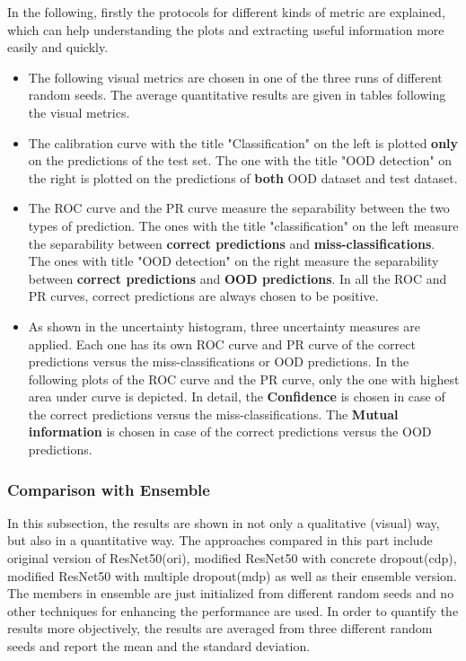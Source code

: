 In the following, firstly the protocols for different kinds of metric are explained, which can help understanding the plots and extracting useful information more easily and quickly.  
\begin{itemize}
	\item The following visual metrics are chosen in one of the three runs of different random seeds. The average quantitative results are given in tables following the visual metrics.
	\item The calibration curve with the title "Classification" on the left is plotted \textbf{only} on the predictions of the test set. The one with the title "OOD detection" on the right is plotted on the predictions of \textbf{both} OOD dataset and test dataset.
	\item The ROC curve and the PR curve measure the separability between the two types of prediction.
	The ones with the title "classification" on the left measure the separability between \textbf{correct predictions} and \textbf{miss-classifications}. The ones with title "OOD detection" on the right measure the separability between \textbf{correct predictions} and \textbf{OOD predictions}. In all the ROC and PR curves, correct predictions are always chosen to be positive.
	\item As shown in the uncertainty histogram, three uncertainty measures are applied. Each one has its own ROC curve and PR curve of the correct predictions versus the miss-classifications or OOD predictions. In the following plots of the ROC curve and the PR curve, only the one with highest area under curve is depicted. In detail, the \textbf{Confidence} is chosen in case of the correct predictions versus the miss-classifications. The \textbf{Mutual information} is chosen in case of the correct predictions versus the OOD predictions.
\end{itemize}   

\subsubsection{Comparison with Ensemble}
In this subsection, the results are shown in not only a qualitative (visual) way, but also in a quantitative way. The approaches compared in this part include original version of ResNet50(ori), modified ResNet50 with concrete dropout(cdp), modified ResNet50 with multiple dropout(mdp) as well as their ensemble version. The members in ensemble are just initialized from different random seeds and no other techniques for enhancing the performance are used. In order to quantify the results more objectively, the results are averaged from three different random seeds and report the mean and the standard deviation.

